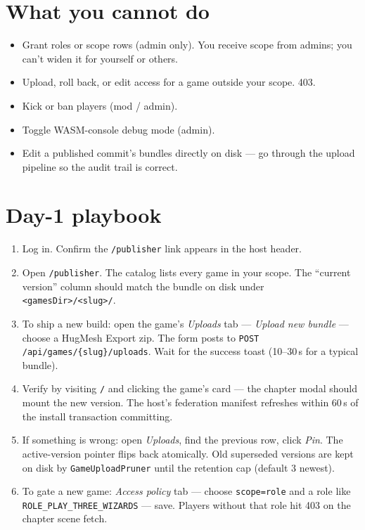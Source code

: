 \documentclass[11pt,a4paper,openany]{book}
\begin{document}
\chapter{What you cannot do}
\begin{itemize}
  \item Grant roles or scope rows (admin only). You receive scope
        from admins; you can't widen it for yourself or others.
  \item Upload, roll back, or edit access for a game outside your
        scope. 403.
  \item Kick or ban players (mod / admin).
  \item Toggle WASM-console debug mode (admin).
  \item Edit a published commit's bundles directly on disk --- go
        through the upload pipeline so the audit trail is correct.
\end{itemize}

\chapter{Day-1 playbook}
\begin{enumerate}
  \item Log in. Confirm the \texttt{/publisher} link appears in the
        host header.
  \item Open \texttt{/publisher}. The catalog lists every game in
        your scope. The ``current version'' column should match the
        bundle on disk under \texttt{<gamesDir>/<slug>/}.
  \item To ship a new build: open the game's \emph{Uploads} tab ---
        \emph{Upload new bundle} --- choose a HugMesh Export zip.
        The form posts to \texttt{POST /api/games/\{slug\}/uploads}.
        Wait for the success toast (10--30\,s for a typical bundle).
  \item Verify by visiting \texttt{/} and clicking the game's card ---
        the chapter modal should mount the new version. The host's
        federation manifest refreshes within 60\,s of the install
        transaction committing.
  \item If something is wrong: open \emph{Uploads}, find the previous
        row, click \emph{Pin}. The active-version pointer flips back
        atomically. Old superseded versions are kept on disk by
        \texttt{GameUploadPruner} until the retention cap (default 3
        newest).
  \item To gate a new game: \emph{Access policy} tab --- choose
        \texttt{scope=role} and a role like
        \texttt{ROLE\_PLAY\_THREE\_WIZARDS} --- save. Players without
        that role hit 403 on the chapter scene fetch.
\end{enumerate}
\end{document}
